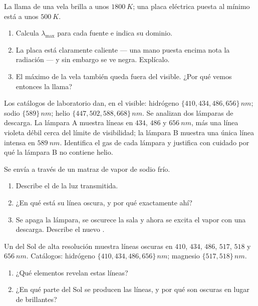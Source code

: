 \begin{exercise}[$\star\star$]\label{exo:g10:light-spectra:7}
La llama de una vela brilla a unos $\qty{1800}{K}$; una placa eléctrica
puesta al mínimo está a unos $\qty{500}{K}$.
\begin{enumerate}
  \item Calcula $\lambda_{\max}$ para cada fuente e indica su dominio.
  \item La placa está claramente caliente --- una mano puesta encima
        nota la radiación --- y sin embargo se ve negra. Explícalo.
  \item El máximo de la vela también queda fuera del visible. ¿Por qué
        vemos entonces la llama?
\end{enumerate}
\end{exercise}

\begin{exercise}[$\star\star$]\label{exo:g10:light-spectra:8}
Los catálogos de laboratorio dan, en el visible: hidrógeno
$\{410, 434, 486, 656\}\,\unit{nm}$; sodio $\{589\}\,\unit{nm}$; helio
$\{447, 502, 588, 668\}\,\unit{nm}$. Se analizan dos lámparas de
descarga. La lámpara A muestra líneas en $434$, $486$ y $\qty{656}{nm}$,
más una línea violeta débil cerca del límite de visibilidad; la lámpara
B muestra una única línea intensa en $\qty{589}{nm}$. Identifica el gas
de cada lámpara y justifica con cuidado por qué la lámpara B no contiene
helio.
\end{exercise}

\begin{exercise}[$\star\star$]\label{exo:g10:light-spectra:9}
Se envía  a través de un matraz de vapor de sodio frío.
\begin{enumerate}
  \item Describe el  de la luz transmitida.
  \item ¿En qué  está su línea oscura, y por qué
        exactamente ahí?
  \item Se apaga la lámpara, se oscurece la sala y ahora se excita el
        vapor con una descarga. Describe el nuevo .
\end{enumerate}
\end{exercise}

\begin{exercise}[$\star\star$]\label{exo:g10:light-spectra:10}
Un  del Sol de alta resolución muestra líneas oscuras en $410$,
$434$, $486$, $517$, $518$ y $\qty{656}{nm}$. Catálogos: hidrógeno
$\{410, 434, 486, 656\}\,\unit{nm}$; magnesio
$\{517, 518\}\,\unit{nm}$.
\begin{enumerate}
  \item ¿Qué elementos revelan estas líneas?
  \item ¿En qué parte del Sol se producen las líneas, y por qué son
        oscuras en lugar de brillantes?
\end{enumerate}
\end{exercise}

